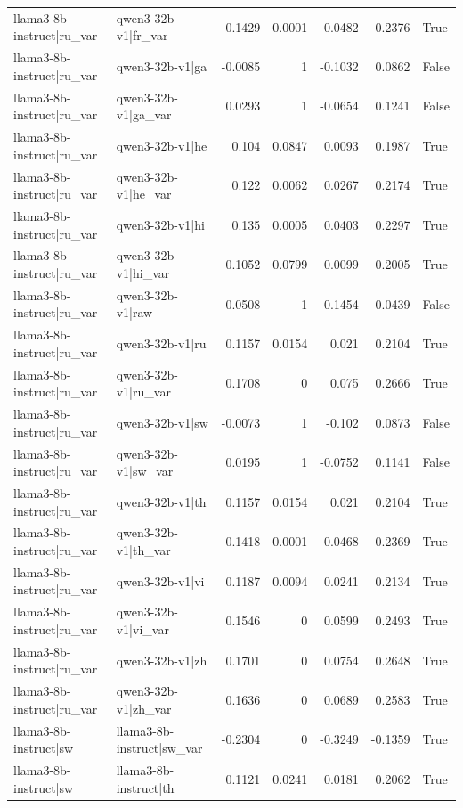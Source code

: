 \begin{table}
\begin{tabular}{l l r r r r l}
llama3-8b-instruct|ru_var & qwen3-32b-v1|fr_var & 0.1429 & 0.0001 & 0.0482 & 0.2376 & True \\
llama3-8b-instruct|ru_var & qwen3-32b-v1|ga & -0.0085 & 1 & -0.1032 & 0.0862 & False \\
llama3-8b-instruct|ru_var & qwen3-32b-v1|ga_var & 0.0293 & 1 & -0.0654 & 0.1241 & False \\
llama3-8b-instruct|ru_var & qwen3-32b-v1|he & 0.104 & 0.0847 & 0.0093 & 0.1987 & True \\
llama3-8b-instruct|ru_var & qwen3-32b-v1|he_var & 0.122 & 0.0062 & 0.0267 & 0.2174 & True \\
llama3-8b-instruct|ru_var & qwen3-32b-v1|hi & 0.135 & 0.0005 & 0.0403 & 0.2297 & True \\
llama3-8b-instruct|ru_var & qwen3-32b-v1|hi_var & 0.1052 & 0.0799 & 0.0099 & 0.2005 & True \\
llama3-8b-instruct|ru_var & qwen3-32b-v1|raw & -0.0508 & 1 & -0.1454 & 0.0439 & False \\
llama3-8b-instruct|ru_var & qwen3-32b-v1|ru & 0.1157 & 0.0154 & 0.021 & 0.2104 & True \\
llama3-8b-instruct|ru_var & qwen3-32b-v1|ru_var & 0.1708 & 0 & 0.075 & 0.2666 & True \\
llama3-8b-instruct|ru_var & qwen3-32b-v1|sw & -0.0073 & 1 & -0.102 & 0.0873 & False \\
llama3-8b-instruct|ru_var & qwen3-32b-v1|sw_var & 0.0195 & 1 & -0.0752 & 0.1141 & False \\
llama3-8b-instruct|ru_var & qwen3-32b-v1|th & 0.1157 & 0.0154 & 0.021 & 0.2104 & True \\
llama3-8b-instruct|ru_var & qwen3-32b-v1|th_var & 0.1418 & 0.0001 & 0.0468 & 0.2369 & True \\
llama3-8b-instruct|ru_var & qwen3-32b-v1|vi & 0.1187 & 0.0094 & 0.0241 & 0.2134 & True \\
llama3-8b-instruct|ru_var & qwen3-32b-v1|vi_var & 0.1546 & 0 & 0.0599 & 0.2493 & True \\
llama3-8b-instruct|ru_var & qwen3-32b-v1|zh & 0.1701 & 0 & 0.0754 & 0.2648 & True \\
llama3-8b-instruct|ru_var & qwen3-32b-v1|zh_var & 0.1636 & 0 & 0.0689 & 0.2583 & True \\
llama3-8b-instruct|sw & llama3-8b-instruct|sw_var & -0.2304 & 0 & -0.3249 & -0.1359 & True \\
llama3-8b-instruct|sw & llama3-8b-instruct|th & 0.1121 & 0.0241 & 0.0181 & 0.2062 & True \\

\end{tabular}
\end{table}
